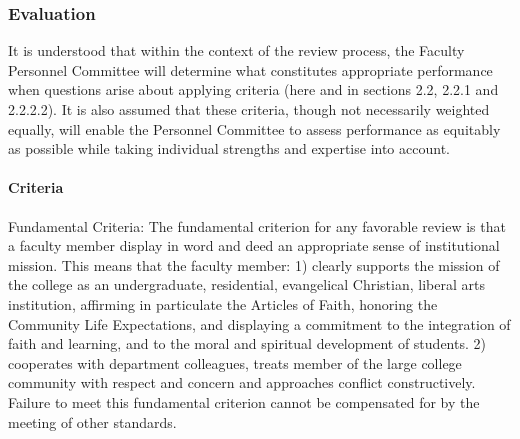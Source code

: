 \documentclass[letterpaper, 11pt]{article}
\begin{document}
		\subsubsection{Evaluation}
			It is understood that within the context of the review process, the Faculty Personnel Committee will determine what constitutes appropriate performance when questions arise about applying criteria (here and in sections 2.2, 2.2.1 and 2.2.2.2).  It is also assumed that these criteria, though not necessarily weighted equally, will enable the Personnel Committee to assess performance as equitably as possible while taking individual strengths and expertise into account.

			\paragraph{Criteria}
				Fundamental Criteria: The fundamental criterion for any favorable review is that a faculty member display in word and deed an appropriate sense of institutional mission. This means that the faculty member:
				1) clearly supports the mission of the college as an undergraduate, residential, evangelical Christian, liberal arts institution, affirming in particulate the Articles of Faith, honoring the Community Life Expectations, and displaying a commitment to the integration of faith and learning, and to the moral and spiritual development of students.
				2) cooperates with department colleagues, treats member of the large college community with respect and concern and approaches conflict constructively.
				Failure to meet this fundamental criterion cannot be compensated for by the meeting of other standards.
\end{document}
